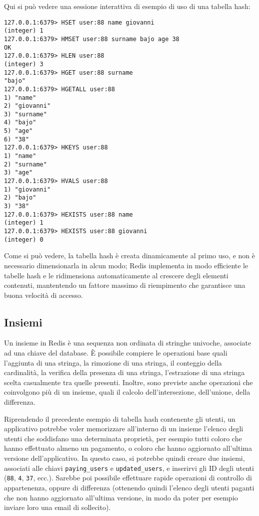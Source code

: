 Qui si può vedere una sessione interattiva di esempio di uso di una tabella hash:

\medskip
\begin{lstlisting}
127.0.0.1:6379> HSET user:88 name giovanni
(integer) 1
127.0.0.1:6379> HMSET user:88 surname bajo age 38
OK
127.0.0.1:6379> HLEN user:88
(integer) 3
127.0.0.1:6379> HGET user:88 surname
"bajo"
127.0.0.1:6379> HGETALL user:88
1) "name"
2) "giovanni"
3) "surname"
4) "bajo"
5) "age"
6) "38"
127.0.0.1:6379> HKEYS user:88
1) "name"
2) "surname"
3) "age"
127.0.0.1:6379> HVALS user:88
1) "giovanni"
2) "bajo"
3) "38"
127.0.0.1:6379> HEXISTS user:88 name
(integer) 1
127.0.0.1:6379> HEXISTS user:88 giovanni
(integer) 0
\end{lstlisting}

Come si può vedere, la tabella hash è creata dinamicamente al primo uso, e non è necessario dimensionarla in alcun
modo; Redis implementa in modo efficiente le tabelle hash e le ridimensiona automaticamente al crescere degli
elementi contenuti, mantentendo un fattore massimo di riempimento che garantisce una buona velocità di accesso.

\subsection{Insiemi}

Un insieme in Redis è una sequenza non ordinata di stringhe univoche, associate ad una chiave del database. È
possibile compiere le operazioni base quali l'aggiunta di una stringa, la rimozione di una stringa, il conteggio
della cardinalità, la verifica della presenza di una stringa, l'estrazione di una stringa scelta casualmente
tra quelle presenti. Inoltre, sono previste anche operazioni che coinvolgono più di un insieme, quali il 
calcolo dell'intersezione, dell'unione, della differenza.

Riprendendo il precedente esempio di tabella hash contenente gli utenti, un applicativo potrebbe voler memorizzare
all'interno di un insieme l'elenco degli utenti che soddisfano una determinata proprietà, per esempio tutti
coloro che hanno effettuato almeno un pagamento, o coloro che hanno aggiornato all'ultima versione dell'applicativo. 
In questo caso, si potrebbe quindi creare due insiemi, associati alle chiavi \verb|paying_users| e \verb|updated_users|,
e inserirvi gli ID degli utenti (\verb|88|, \verb|4|, \verb|37|, ecc.). Sarebbe poi possibile effettuare rapide operazioni
di controllo di appartenenza, oppure di differenza (ottenendo quindi l'elenco degli utenti paganti che non hanno
aggiornato all'ultima versione, in modo da poter per esempio inviare loro una email di sollecito).

